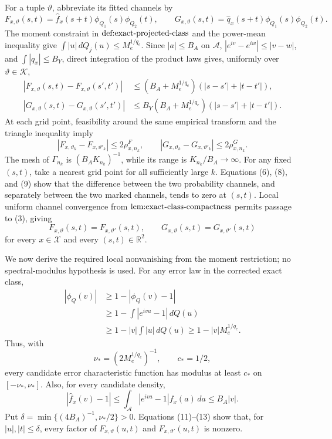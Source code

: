 For a tuple \(\vartheta\), abbreviate its fitted channels by
\[
 F_{x,\vartheta}(s,t)
 =\widehat f_x(s+t)\phi_{Q_1}(s)\phi_{Q_2}(t),
 \qquad
 G_{x,\vartheta}(s,t)
 =\widehat q_x(s+t)\phi_{Q_1}(s)\phi_{Q_2}(t).                    \tag{7}
\]
The moment constraint in \(\textnormal{def:exact-projected-class}\) and the
power-mean inequality give
\(\int|u|\,dQ_j(u)\le M_e^{1/q_e}\).  Since \(|a|\le B_A\) on
\(\mathcal A\), \(|e^{iv}-e^{iw}|\le|v-w|\), and
\(\int|q_x|\le B_Y\), direct integration of the product laws gives, uniformly
over \(\vartheta\in\mathscr K\),
\[
 \begin{aligned}
 |F_{x,\vartheta}(s,t)-F_{x,\vartheta}(s',t')|
 &\le(B_A+M_e^{1/q_e})(|s-s'|+|t-t'|),\\
 |G_{x,\vartheta}(s,t)-G_{x,\vartheta}(s',t')|
 &\le B_Y(B_A+M_e^{1/q_e})(|s-s'|+|t-t'|).
 \end{aligned}                                                    \tag{8}
\]
At each grid point, feasibility around the same empirical transform and the
triangle inequality imply
\[
 |F_{x,\vartheta_k}-F_{x,\vartheta'_k}|\le2\rho^F_{x,n_k},
 \qquad
 |G_{x,\vartheta_k}-G_{x,\vartheta'_k}|\le2\rho^G_{x,n_k}.         \tag{9}
\]
The mesh of \(\Gamma_{n_k}\) is \((B_AK_{n_k})^{-1}\), while its range is
\(K_{n_k}/B_A\to\infty\).  For any fixed \((s,t)\), take a nearest grid
point for all sufficiently large \(k\).  Equations (6), (8), and (9) show
that the difference between the two probability channels, and separately
between the two marked channels, tends to zero at \((s,t)\).  Local uniform
channel convergence from \(\textnormal{lem:exact-class-compactness}\) permits
passage to (3), giving
\[
 F_{x,\vartheta}(s,t)=F_{x,\vartheta'}(s,t),
 \qquad
 G_{x,\vartheta}(s,t)=G_{x,\vartheta'}(s,t)                       \tag{10}
\]
for every \(x\in\mathcal X\) and every \((s,t)\in\mathbb R^2\).

We now derive the required local nonvanishing from the moment restriction;
no spectral-modulus hypothesis is used.  For any error law in the corrected
exact class,
\[
 \begin{aligned}
 |\phi_Q(v)|
 &\ge1-|\phi_Q(v)-1|\\
 &\ge1-\int|e^{ivu}-1|\,dQ(u)\\
 &\ge1-|v|\int|u|\,dQ(u)
 \ge1-|v|M_e^{1/q_e}.                                             \tag{11}
 \end{aligned}
\]
Thus, with
\[
 \nu_*=(2M_e^{1/q_e})^{-1},\qquad c_*=1/2,                        \tag{12}
\]
every candidate error characteristic function has modulus at least \(c_*\)
on \([-\nu_*,\nu_*]\).  Also, for every candidate density,
\[
 |\widehat f_x(v)-1|
 \le\int_{\mathcal A}|e^{iva}-1|f_x(a)\,da
 \le B_A|v|.                                                      \tag{13}
\]
Put \(\delta=\min\{(4B_A)^{-1},\nu_*/2\}>0\).  Equations (11)--(13)
show that, for \(|u|,|t|\le\delta\), every factor of
\(F_{x,\vartheta}(u,t)\) and \(F_{x,\vartheta'}(u,t)\) is nonzero.


